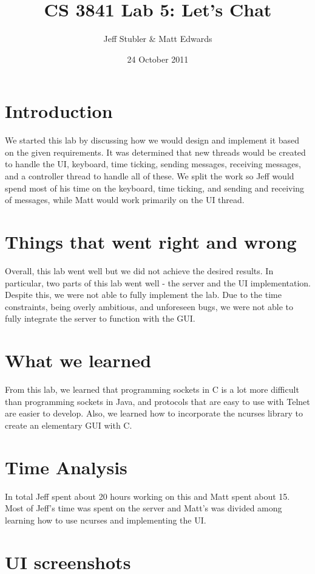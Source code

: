 \documentclass{article}
\begin{document}
\title{CS 3841 Lab 5: Let's Chat}
\author{Jeff Stubler \& Matt Edwards}
\date{24 October 2011}
\maketitle

\section*{Introduction}
We started this lab by discussing how we would design and implement it based on the given requirements. It was determined that new threads would be created to handle the UI, keyboard, time ticking, sending messages, receiving messages, and a controller thread to handle all of these. We split the work so Jeff would spend most of his time on the keyboard, time ticking, and sending and receiving of messages, while Matt would work primarily on the UI thread.

\section*{Things that went right and wrong}
Overall, this lab went well but we did not achieve the desired results. In particular, two parts of this lab went well - the server and the UI implementation. Despite this, we were not able to fully implement the lab. Due to the time constraints, being overly ambitious, and unforeseen bugs, we were not able to fully integrate the server to function with the GUI.

\section*{What we learned}
From this lab, we learned that programming sockets in C is a lot more difficult than programming sockets in Java, and protocols that are easy to use with Telnet are easier to develop. Also, we learned how to incorporate the ncurses library to create an elementary GUI with C.

\section*{Time Analysis}
In total Jeff spent about 20 hours working on this and Matt spent about 15. Most of Jeff's time was spent on the server and Matt's was divided among learning how to use ncurses and implementing the UI.

\section*{UI screenshots}
\end{document}
